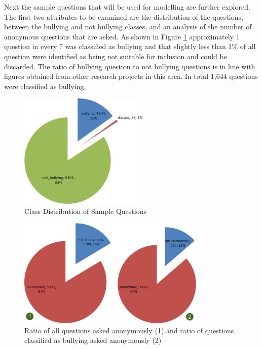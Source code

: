 Next the sample questions that will be used for modelling are further explored. The first two attributes to be examined are the distribution of the questions, between the bullying and not bullying classes, and an analysis of the number of anonymous questions that are asked. As shown in Figure \ref{fig:chapter4:class_distribution} approximately 1 question in every 7 was classified as bullying and that slightly less than 1\% of all question were identified as being not suitable for inclusion and could be discarded. The ratio of bullying question to not bullying questions is in line with figures obtained from other research projects in this area. In total 1,644 questions were classified as bullying.

\begin{figure}[htbp]
	\centering
	\includegraphics[width=0.55\textwidth]{Figures/Chapter4/class_distribution.jpg}
	\caption[Class Distribution of Sample Questions]{Class Distribution of Sample Questions}
	\label{fig:chapter4:class_distribution}
\end{figure}

\begin{figure}[htbp]
	\centering
	\includegraphics[width=0.8\textwidth]{Figures/Chapter4/anonymous_distribution.jpg}
	\caption[Sample Questions asked Anonymously]{Ratio of all questions asked anonymously (1) and ratio of questions classified as bullying asked anonymously (2)}
	\label{fig:chapter4:anonymous_distribution}
\end{figure}


